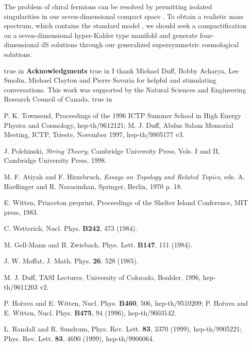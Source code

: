 \documentclass[a4paper,12pt]{article}
\begin{document}
The problem of chiral fermions can be resolved by permitting isolated
singularities in our seven-dimensional compact space \coordHE{}. To
obtain a realistic mass spectrum, which contains the standard
model \coordHE{}, we should seek a compactification on a
seven-dimensional hyper-Kahler type manifold and generate four-dimensional dS
solutions through our generalized supersymmetric cosmological solutions.


 true in
{\bf Acknowledgments}
 true in
I thank Michael Duff, Bobby Acharya, Lee Smolin, Michael Clayton and Pierre Savaria
for helpful and stimulating conversations. This work was supported by the Natural
Sciences and Engineering Research Council of Canada.
 true in

\begin{thebibliography}{100}

 P. K. Townsend, Proceedings of the 1996 ICTP
Summer School in High Energy Physics and Cosmology,
hep-th/9612121; M. J. Duff, Abdus Salam Memorial Meeting, ICTP,
Trieste, November 1997, hep-th/9805177 v3.

 J. Polchinski, {\it String Theory},
Cambridge University Press, Vols. I and II, Cambridge University
Press, 1998.

 M. F. Atiyah and F. Hirzebruch, {\it Essays on
Topology and Related Topics}, eds. A. Haeflinger and R.
Narasimhan, Springer, Berlin, 1970 p. 18.

 E. Witten, Princeton preprint, Proceedings of the
Shelter Island Conference, MIT press, 1983.

 C. Wetterich, Nucl. Phys. {\bf B242}, 473 (1984).

 M. Gell-Mann and B. Zwiebach, Phys. Lett. {\bf
B147}, 111 (1984).

 J. W. Moffat, J. Math. Phys. {\bf 26}, 528
(1985).

 M. J. Duff, TASI Lectures, University of Colorado,
Boulder, 1996, hep-th/9611203 v2.

 P. Ho\u{r}ava and E. Witten, Nucl. Phys. {\bf
B460}, 506, hep-th/9510209; P. Ho\u{r}ava and E. Witten, Nucl. Phys.
{\bf B475}, 94 (1996), hep-th/9603142.

 L. Randall and R. Sundrum, Phys. Rev. Lett.
{\bf 83}, 3370 (1999), hep-th/9905221; Phys. Rev. Lett. {\bf 83},
4690 (1999), hep-th/9906064.


\end{thebibliography}
\end{document}
